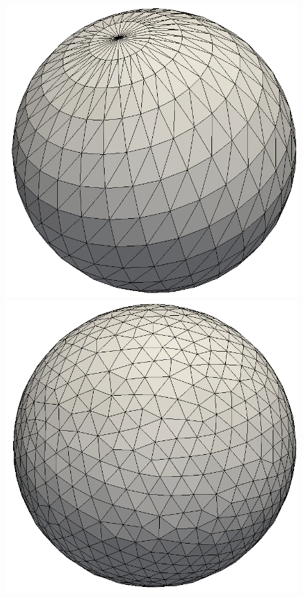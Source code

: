 \documentclass[letter,11pt]{article}
\begin{document}
\begin{figure}
  \centering
  \begin{minipage}{.30\textwidth}
    \centering
    \includegraphics[width=1\linewidth]{../image/sphere_0.png}
  \end{minipage} 
  \begin{minipage}{0.30\textwidth}
    \centering
    \includegraphics[width=1\linewidth]{../image/sphere_b.png}

\end{minipage}
\end{figure}
\end{document}
